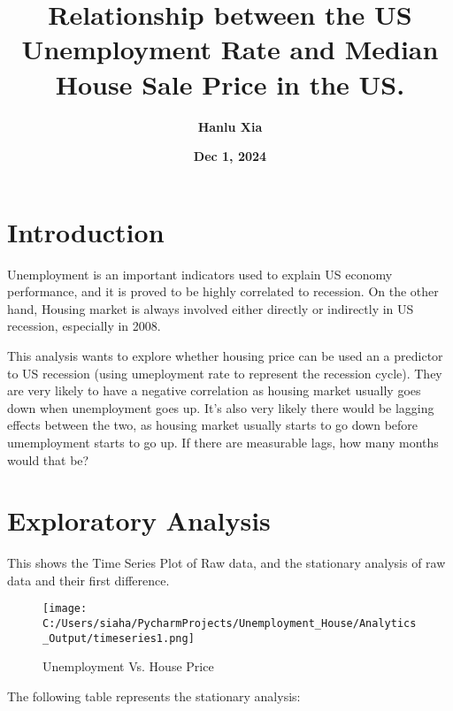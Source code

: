 \documentclass[twocolumn,12pt]{article}
\begin{document}
\title{\textbf{\textcolor{indigo(dye)}{Relationship between the US Unemployment Rate and Median House Sale Price in the US.}}}
\author{\textbf{\textcolor{indigo(dye)}{Hanlu Xia}}}
\date{\textbf{\textcolor{indigo(dye)}{Dec 1, 2024}}}
\maketitle

\section*{\textcolor{indigo(dye)}{Introduction}}

Unemployment is an important indicators used to explain US economy performance, and it is proved to be highly correlated to recession. On the other hand, Housing market is always involved either directly or indirectly in US recession, especially in 2008.

This analysis wants to explore whether housing price can be used an a predictor to US recession (using umeployment rate to represent the recession cycle). They are very likely to have a negative correlation as housing market usually goes down when unemployment goes up. It's also very likely there would be lagging effects between the two, as housing market usually starts to go down before umemployment starts to go up. If there are measurable lags, how many months would that be?

\section*{\textcolor{indigo(dye)}{Exploratory Analysis}}
This shows the Time Series Plot of Raw data, and the stationary analysis of raw data and their first difference.

\begin{figure*}[ht]
\centering
\texttt{[image: C:/Users/siaha/PycharmProjects/Unemployment\_House/Analytics\_Output/timeseries1.png]}
\caption{Unemployment Vs. House Price}
\end{figure*}

The following table represents the stationary analysis:


\begin{table}[H]
\caption{Stationary Analysis}
\end{table}
\end{document}
